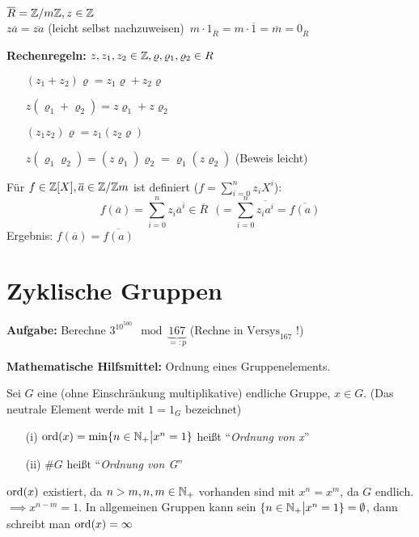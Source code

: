 \documentclass[a4paper,twoside,DIV15,BCOR12mm]{scrbook}
\begin{document}
\begin{beispiel}
    $\overline R = \mathbb{Z}/m\mathbb{Z}, z \in \mathbb{Z}$\\
    $z\overline a = \overline{za}$ (leicht selbst nachzuweisen)\
    $m \cdot 1_{\overline R} = m \cdot \overline 1 = \overline m = 0_{\overline R}$
\end{beispiel}

\textbf{Rechenregeln:} $z, z_1, z_2 \in \mathbb{Z}, \varrho, \varrho_1,
\varrho_2 \in R$
\begin{itemize}
    \item[] $(z_1 + z_2)\varrho = z_1\varrho + z_2\varrho$
    \item[] $z(\varrho_1 + \varrho_2) = z\varrho_1 + z\varrho_2$
    \item[] $(z_1z_2)\varrho = z_1(z_2\varrho)$
    \item[] $z(\varrho_1\varrho_2) = (z\varrho_1)\varrho_2 = \varrho_1(z\varrho_2)$ (Beweis leicht)
\end{itemize}

Für $f \in \mathbb{Z}[X], \overline a \in \mathbb{Z}/\mathbb{Z} m$ ist definiert ($f =
\sum_{i=0}^n z_iX^i$):
\[f(\overline a) = \sum_{i=0}^nz_i\overline a^i \in \overline R \text{ } (= \sum_{i=0}^n\overline{z_ia^i} = \overline{f(a)}\]
Ergebnis: $f(\overline a) = \overline{f(a)}$

\section{Zyklische Gruppen}

\textbf{Aufgabe:} Berechne $3^{10^{500}} \mod
\underbrace{167}_{=:p}$ (Rechne in $\text{Versys}_{167}$ !)

\textbf{Mathematische Hilfsmittel:} Ordnung eines Gruppenelements.

\begin{definition}
    Sei $G$ eine (ohne Einschränkung multiplikative) endliche Gruppe, $x \in G$. (Das neutrale Element werde mit $1 = 1_G$ bezeichnet)
    \begin{itemize}
        \item[(i)] $\mathop{\rm ord}\nolimits(x) = \min \{n \in \mathbb{N}_+ \big| x^n = 1\}$ heißt "`\emph{Ordnung von x}"'
        \item[(ii)] $\#G$ heißt "`\emph{Ordnung von G}"'
    \end{itemize}
\end{definition}

\begin{bemerkung}
    $\mathop{\rm ord}\nolimits(x)$ existiert, da $n > m, n,m \in \mathbb{N}_+$ vorhanden sind mit $x^n = x^m$, da $G$ endlich. $\implies x^{n-m} = 1$. In allgemeinen Gruppen kann sein $\{n \in \mathbb{N}_+ \big| x^n = 1\} = \emptyset$, dann schreibt man $\mathop{\rm ord}\nolimits(x) = \infty$
\end{bemerkung}
\end{document}
